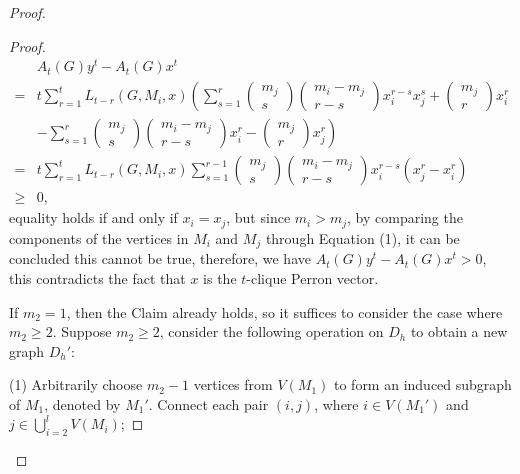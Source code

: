 \documentclass[10pt,a4paper]{amsart}
\begin{document}
\begin{proof}
\begin{proof}
\begin{align*}
                        &A_t(G)y^t-A_t(G)x^t
                        \\= &t\sum_{r=1}^t L_{t-r}(G, M_i, x) \left( \sum_{s=1}^r \begin{pmatrix} m_j\\s \end{pmatrix} \begin{pmatrix}m_i-m_j\\ r-s \end{pmatrix} x_i^{r-s}x_j^{s} + \begin{pmatrix}m_j\\r\end{pmatrix} x_i^r \right.
                        \\& \left.- \sum_{s=1}^r \begin{pmatrix} m_j\\s \end{pmatrix} \begin{pmatrix}m_i-m_j\\ r-s \end{pmatrix} x_i^{r} - \begin{pmatrix}m_j\\r\end{pmatrix} x_j^r \right)
                        \\= &t\sum_{r=1}^t L_{t-r}(G, M_i, x) \sum_{s=1}^{r-1} \begin{pmatrix} m_j\\s \end{pmatrix} \begin{pmatrix}m_i-m_j\\ r-s \end{pmatrix} x_i^{r-s}(x_j^{r}-x_i^{r})
                        \\\geq &0,
                    \end{align*}
                equality holds if and only if $x_i=x_j$, but since $m_i > m_j$, by comparing the components of the vertices in $M_i $ and $M_j $ through Equation (1), it can be concluded this cannot be true, therefore, we have $A_t(G)y^t-A_t(G)x^t > 0$, this contradicts the fact that $x$ is the $t$-clique Perron vector.

                If $m_2 = 1$, then the Claim already holds, so it suffices to consider the case where $m_2 \geq 2$. Suppose $m_2 \geq 2$, consider the following operation on $D_h$ to obtain a new graph $D_h'$:

                \noindent (1) Arbitrarily choose $m_2 - 1$ vertices from $V(M_1)$ to form an induced subgraph of $M_1$, denoted by $M_1'$. Connect each pair $(i, j)$, where $i \in V(M_1')$ and $j \in \bigcup_{i=2}^l V(M_i)$;


\end{proof}
\end{proof}
\end{document}
